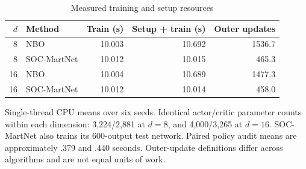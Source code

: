 \begin{table}[htbp]
\centering\small
\caption{Measured training and setup resources}\label{r8:tab:resources}
\begin{tabular}{@{}rlrrr@{}}
\toprule
$d$ & Method & Train (s) & Setup + train (s) & Outer updates \\
\midrule
8 & NBO & 10.003 & 10.692 & 1536.7 \\
8 & SOC-MartNet & 10.012 & 10.015 & 465.3 \\
16 & NBO & 10.004 & 10.689 & 1477.3 \\
16 & SOC-MartNet & 10.012 & 10.014 & 458.0 \\
\bottomrule
\end{tabular}
\par\smallskip\footnotesize Single-thread CPU means over six seeds. Identical actor/critic parameter counts within each dimension: 3,224/2,881 at $d=8$, and 4,000/3,265 at $d=16$. SOC-MartNet also trains its 600-output test network. Paired policy audit means are approximately .379 and .440 seconds. Outer-update definitions differ across algorithms and are not equal units of work.
\end{table}
